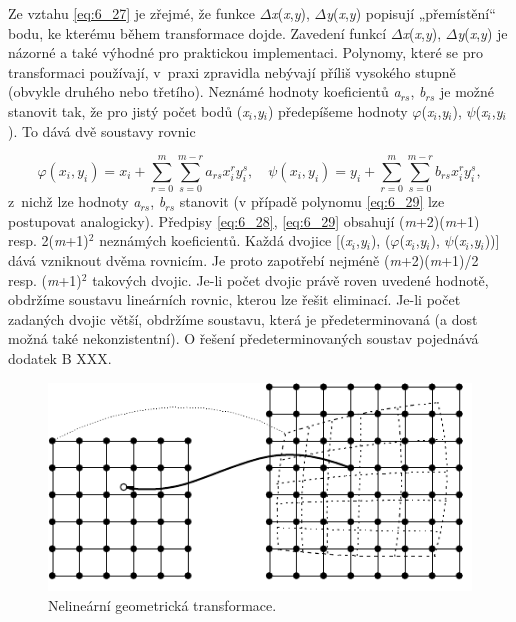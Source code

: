 Ze vztahu \eqref{eq:6_27} je zřejmé, že funkce $\Delta$\textit{x}(\textit{x},\textit{y}), $\Delta$\textit{y}(\textit{x},\textit{y}) popisují „přemístění`` bodu, ke kterému během transformace dojde. Zavedení funkcí $\Delta$\textit{x}(\textit{x},\textit{y}), $\Delta$\textit{y}(\textit{x},\textit{y}) je názorné a také výhodné pro praktickou implementaci. Polynomy, které se pro transformaci používají, v~praxi zpravidla nebývají příliš vysokého stupně (obvykle druhého nebo třetího). Neznámé hodnoty koeficientů \textit{a}$_{rs}$, \textit{b}$_{rs}$ je možné stanovit tak, že pro jistý počet bodů (\textit{x}$_i$,\textit{y}$_i$) předepíšeme hodnoty $\varphi$(\textit{x}$_i$,\textit{y}$_i$), $\psi$(\textit{x}$_i$,\textit{y}$_i$). To dává dvě soustavy rovnic

\begin{equation} \label{eq:6_30}
    \varphi \left(x_{i} ,y_{i} \right)=x_{i} +\sum_{r=0}^{m}\sum_{s=0}^{m-r}a_{rs} x_{i}^{r} y_{i}^{s},
    \quad
    \psi \left(x_{i} ,y_{i} \right)=y_{i} +\sum _{r=0}^{m}\sum _{s=0}^{m-r}b_{rs} x_{i}^{r} y_{i}^{s},
\end{equation} 
z~nichž lze hodnoty \textit{a}$_{rs}$, \textit{b}$_{rs}$ stanovit (v případě polynomu \eqref{eq:6_29} lze postupovat analogicky). Předpisy \eqref{eq:6_28}, \eqref{eq:6_29} obsahují (\textit{m}+2)(\textit{m}+1) resp. 2(\textit{m}+1)$^2$ neznámých koeficientů. Každá dvojice [(\textit{x}$_i$,\textit{y}$_i$), ($\varphi$(\textit{x}$_i$,\textit{y}$_i$), $\psi$(\textit{x}$_i$,\textit{y}$_i$))] dává vzniknout dvěma rovnicím. Je proto zapotřebí nejméně (\textit{m}+2)(\textit{m}+1)/2 resp. (\textit{m}+1)$^2$ takových dvojic. Je-li počet dvojic právě roven uvedené hodnotě, obdržíme soustavu lineárních rovnic, kterou lze řešit eliminací. Je-li počet zadaných dvojic větší, obdržíme soustavu, která je předeterminovaná (a dost možná také nekonzistentní). O řešení předeterminovaných soustav pojednává dodatek B XXX.

\begin{figure}[th]
    \begin{center}
        \includegraphics[scale=1.0]{06_bodoveoperace/images/img_6_8.pdf}
    \end{center}
    \caption{Nelineární geometrická transformace.}
    \label{img:6_8}
\end{figure}

